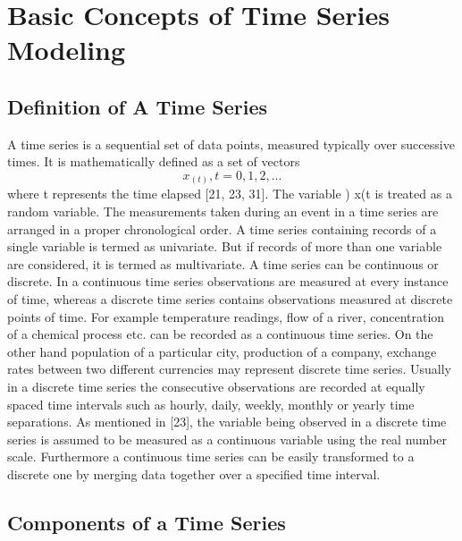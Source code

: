 \documentclass[12pt,a4paper]{article}
\author{Group 9}
\begin{document}
	\section{Basic Concepts of Time Series Modeling}
	\subsection{Definition of A Time Series}
	A time series is a sequential set of data points, measured typically over successive times. It is mathematically defined as a set of vectors $$x_{(t)},t = 0,1,2,... $$where t represents the time elapsed [21, 23, 31]. The variable ) x(t is treated as a random variable. The measurements taken during an event in a time series are arranged in a proper chronological order. A time series containing records of a single variable is termed as univariate. But if records of more than one variable are considered, it is termed as multivariate. A time series can be continuous or discrete. In a continuous time series observations are measured at every instance
	of time, whereas a discrete time series contains observations measured at discrete points of time. For example temperature readings, flow of a river, concentration of a chemical process etc. can be recorded as a continuous time series. On the other hand population of a particular city, production of a company, exchange rates between two different currencies may represent
	discrete time series. Usually in a discrete time series the consecutive observations are recorded at equally spaced time intervals such as hourly, daily, weekly, monthly or yearly time separations. As mentioned in [23], the variable being observed in a discrete time series is assumed to be measured as a continuous variable using the real number scale. Furthermore a continuous time series can be easily transformed to a discrete one by merging data together over a specified time interval.\
	
	\subsection{ Components of a Time Series}
	
\end{document}
